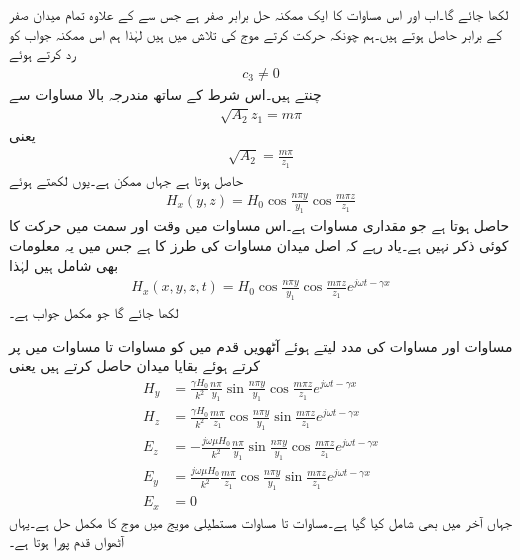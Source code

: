 لکھا جائے گا۔اب   اور اس مساوات کا ایک ممکنہ حل  برابر صفر ہے جس سے  کے علاوہ تمام میدان صفر کے برابر حاصل ہوتے ہیں۔ہم چونکہ حرکت کرتے موج کی تلاش میں ہیں لہٰذا ہم اس ممکنہ جواب کو رد کرتے ہوئے
\begin{align}
c_3 \ne 0
\end{align}
چنتے ہیں۔اس شرط کے ساتھ مندرجہ بالا مساوات سے
\begin{align}
\sqrt{A_2} z_1 = m\pi
\end{align}
یعنی
\begin{align}\label{مساوات_مویج_عمومی_حل_دوسرا_مستقل}
\sqrt{A_2}=\frac{m \pi}{z_1}
\end{align}
حاصل ہوتا ہے جہاں  ممکن ہے۔یوں  لکھتے ہوئے
\begin{align}\label{مساوات_مویج_موج_حل_ث}
H_x(y,z)=H_0 \cos \frac{n \pi y}{y_1}  \cos  \frac{m \pi z}{z_1}
\end{align}
حاصل ہوتا ہے جو مقداری مساوات ہے۔اس مساوات میں وقت  اور  سمت میں حرکت کا کوئی ذکر نہیں ہے۔یاد رہے کہ اصل میدان مساوات  کی طرز کا ہے جس میں یہ معلومات بھی شامل ہیں  لہٰذا
 \begin{align}\label{مساوات_مویج_مکمل_الف}
H_x(x,y,z,t)=H_0 \cos \frac{n \pi y}{y_1}  \cos  \frac{m \pi z}{z_1} e^{j \omega t -\gamma x}
\end{align}
لکھا جائے گا جو مکمل جواب ہے۔

مساوات  اور مساوات  کی مدد لیتے ہوئے آٹھویں قدم میں  کو مساوات  تا مساوات  میں پر کرتے ہوئے بقایا میدان حاصل کرتے ہیں یعنی
\begin{align}
H_y&=\frac{\gamma H_0}{k^2}\frac{n \pi}{y_1} \sin \frac{n\pi y}{y_1} \cos \frac{m \pi z}{z_1} e^{j \omega t -\gamma x} \label{مساوات_مویج_مکمل_ب}\\
H_z&=\frac{\gamma H_0}{k^2}\frac{m \pi}{z_1} \cos \frac{n\pi y}{y_1} \sin \frac{m \pi z}{z_1} e^{j \omega t -\gamma x}\label{مساوات_مویج_مکمل_پ}\\
E_z&=-\frac{j \omega \mu H_0}{k^2}\frac{n \pi}{y_1} \sin \frac{n\pi y}{y_1} \cos \frac{m \pi z}{z_1} e^{j \omega t -\gamma x}\label{مساوات_مویج_مکمل_ت}\\
E_y&=\frac{j \omega \mu H_0}{k^2}\frac{m \pi}{z_1} \cos \frac{n\pi y}{y_1} \sin \frac{m \pi z}{z_1} e^{j \omega t -\gamma x}\label{مساوات_مویج_مکمل_ٹ}\\
E_x&=0 \label{مساوات_مویج_مکمل_ث}
\end{align}
جہاں آخر میں  بھی شامل کیا گیا ہے۔مساوات  تا مساوات  مستطیلی مویج میں  موج کا مکمل حل ہے۔یہاں آٹھواں قدم پورا ہوتا ہے۔

